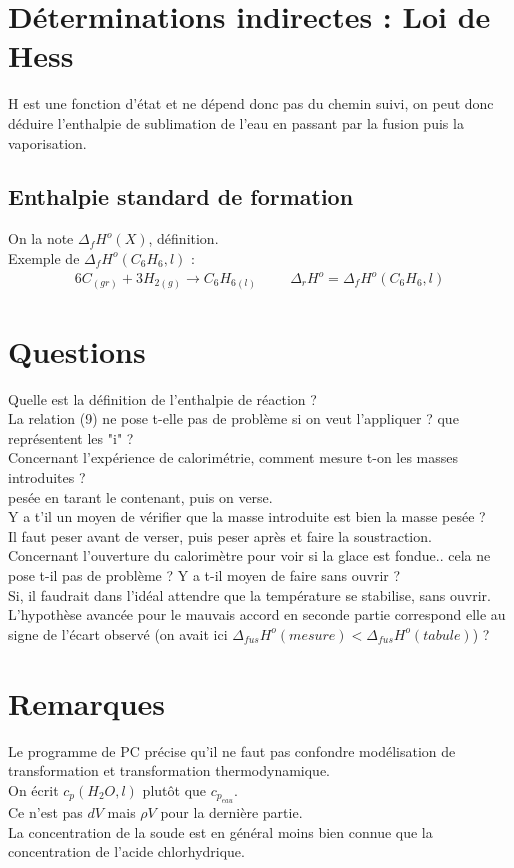 \documentclass[12pt,prb,aps,epsf]{article}
\begin{document}
\section{Déterminations indirectes : Loi de Hess}
H est une fonction d'état et ne dépend donc pas du chemin suivi, on peut donc déduire l'enthalpie de sublimation de l'eau en passant par la fusion puis la vaporisation.
\subsection{Enthalpie standard de formation}
On la note $\Delta_fH^o(X)$, définition.\\
Exemple de $\Delta_fH^o(C_6H_6, l)$ :
\begin{eqnarray}
6C_{(gr)} + 3H_{2(g)} \longrightarrow C_6H_{6(l)}\hspace{1cm}\Delta_r H^o =\Delta_fH^o(C_6H_6, l)
\end{eqnarray}

\section*{Questions}
Quelle est la définition de l'enthalpie de réaction ?\\

La relation (9) ne pose t-elle pas de problème si on veut l'appliquer ? que représentent les "i" ?\\

Concernant l'expérience de calorimétrie, comment mesure t-on les masses introduites ?\\
pesée en tarant le contenant, puis on verse.\\

Y a t'il un moyen de vérifier que la masse introduite est bien la masse pesée ?\\
Il faut peser avant de verser, puis peser après et faire la soustraction.\\

Concernant l'ouverture du calorimètre pour voir si la glace est fondue.. cela ne pose t-il pas de problème ? Y a t-il moyen de faire sans ouvrir ?\\
Si, il faudrait dans l'idéal attendre que la température se stabilise, sans ouvrir.\\

L'hypothèse avancée pour le mauvais accord en seconde partie correspond elle au signe de l'écart observé (on avait ici $\Delta_{fus}H^o (mesure)<\Delta_{fus}H^o (tabule)$) ?\\

\section*{Remarques}
Le programme de PC précise qu'il ne faut pas confondre modélisation de transformation et transformation thermodynamique.\\
On écrit $c_{p}(H_2O,l)$ plutôt que $c_{p_{eau}}$.\\
Ce n'est pas $dV$ mais $\rho V$ pour la dernière partie.\\
La concentration de la soude est en général moins bien connue que la concentration de l'acide chlorhydrique.
\end{document}
